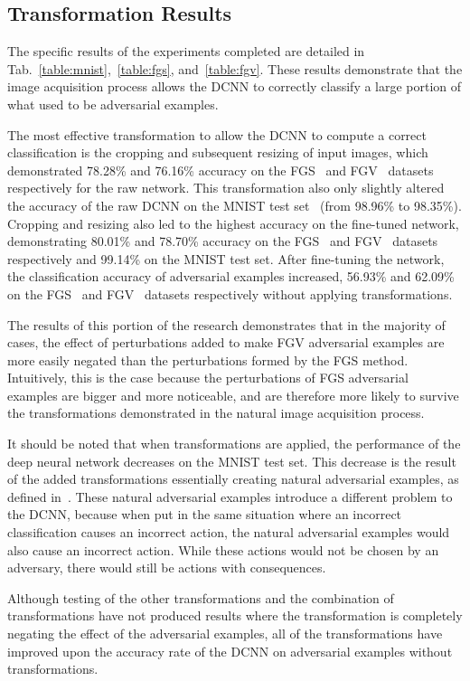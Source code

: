 \documentclass[conference]{IEEEtran}
\begin{document}
\subsection{Transformation Results}
The specific results of the experiments completed are detailed in Tab.~\ref{table:mnist},~\ref{table:fgs}, and~\ref{table:fgv}.  These results demonstrate that the image acquisition process allows the DCNN to correctly classify a large portion of what used to be adversarial examples.\par

The most effective transformation to allow the DCNN to compute a correct classification is the cropping and subsequent resizing of  input images, which demonstrated 78.28\% and 76.16\% accuracy on the FGS~\cite{c5} and FGV~\cite{c1} datasets respectively for the raw network.  This transformation also only slightly altered the accuracy of the raw DCNN on the MNIST test set~\cite{c9} (from 98.96\% to 98.35\%).  Cropping and resizing also led to the highest accuracy on the fine-tuned network, demonstrating 80.01\% and 78.70\% accuracy on the FGS~\cite{c5} and FGV~\cite{c1} datasets respectively and 99.14\% on the MNIST test set.  After fine-tuning the network, the classification accuracy of adversarial examples increased, 56.93\% and 62.09\% on the FGS~\cite{c5} and FGV~\cite{c1} datasets respectively without applying transformations.\par

The results of this  portion of the research demonstrates that in the majority of cases, the effect of perturbations added to make FGV adversarial examples are more easily negated than the perturbations formed by the FGS method.  Intuitively, this is the case because the perturbations of FGS adversarial examples are bigger and more noticeable, and are therefore more likely to survive the transformations demonstrated in the natural image acquisition process.\par 

It should be noted that when transformations are applied, the performance of the deep neural network decreases on the MNIST test set.  This decrease is the result of the added transformations essentially creating natural adversarial examples, as defined in~\cite{c2}.  These natural adversarial examples introduce a different problem to the DCNN, because when put in the same situation where an incorrect classification causes an incorrect action, the natural adversarial examples would also cause an incorrect action.  While these actions would not be chosen by an adversary, there would still be actions with consequences.\par
Although testing of the other transformations and the combination of transformations have not produced results where the transformation is completely negating the effect of the adversarial examples, all of the transformations have improved upon the accuracy rate of the DCNN on adversarial examples without transformations.\par
\end{document}
